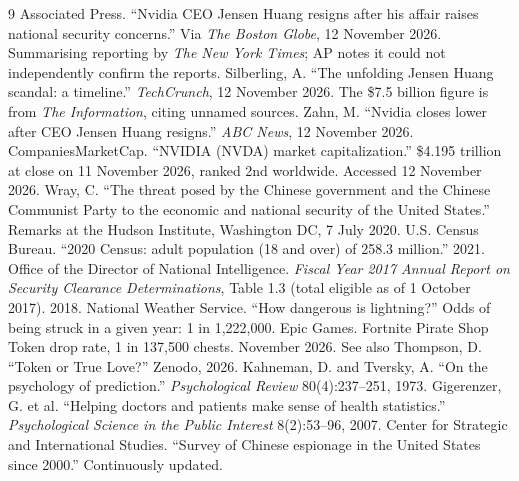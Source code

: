 \documentclass[11pt]{article}
\theoremstyle{definition}
\begin{document}
\begin{thebibliography}{9}\small
{} Associated Press. ``Nvidia CEO Jensen Huang resigns after his affair raises national security concerns.'' Via \textit{The Boston Globe}, 12 November 2026. Summarising reporting by \textit{The New York Times}; AP notes it could not independently confirm the reports.
 Silberling, A. ``The unfolding Jensen Huang scandal: a timeline.'' \textit{TechCrunch}, 12 November 2026. The \$7.5 billion figure is from \textit{The Information}, citing unnamed sources.
 Zahn, M. ``Nvidia closes lower after CEO Jensen Huang resigns.'' \textit{ABC News}, 12 November 2026.
 CompaniesMarketCap. ``NVIDIA (NVDA) market capitalization.'' \$4.195 trillion at close on 11 November 2026, ranked 2nd worldwide. Accessed 12 November 2026.
 Wray, C. ``The threat posed by the Chinese government and the Chinese Communist Party to the economic and national security of the United States.'' Remarks at the Hudson Institute, Washington DC, 7 July 2020.
 U.S. Census Bureau. ``2020 Census: adult population (18 and over) of 258.3 million.'' 2021.
 Office of the Director of National Intelligence. \textit{Fiscal Year 2017 Annual Report on Security Clearance Determinations}, Table 1.3 (total eligible as of 1 October 2017). 2018.
 National Weather Service. ``How dangerous is lightning?'' Odds of being struck in a given year: 1 in 1{,}222{,}000.
 Epic Games. Fortnite Pirate Shop Token drop rate, 1 in 137{,}500 chests. November 2026. See also Thompson, D. ``Token or True Love?'' Zenodo, 2026.
 Kahneman, D. and Tversky, A. ``On the psychology of prediction.'' \textit{Psychological Review} 80(4):237--251, 1973.
 Gigerenzer, G. et al. ``Helping doctors and patients make sense of health statistics.'' \textit{Psychological Science in the Public Interest} 8(2):53--96, 2007.
 Center for Strategic and International Studies. ``Survey of Chinese espionage in the United States since 2000.'' Continuously updated.
\end{thebibliography}
\end{document}

